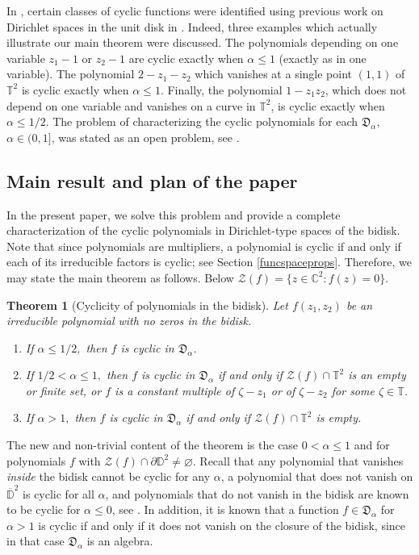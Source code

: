 \documentclass[11 pt,reqno]{amsart}
\newtheorem*{Mth}{Theorem}
\theoremstyle{definition}
\theoremstyle{remark}
\numberwithin{equation}{section} \numberwithin{figure}{section}
\begin{document}
In \cite{BCLSS13II}, certain classes of cyclic functions were
identified using previous work on Dirichlet spaces in the unit disk in
\cite{BCLSS13}.  Indeed, three examples which actually illustrate our
main theorem were discussed.  The polynomials depending on one
variable $z_1-1$ or $z_2-1$ are cyclic exactly when ${\alpha} \leq 1$
(exactly as in one variable).  The polynomial $2-z_1-z_2$ which
vanishes at a single point $(1,1)$ of ${{\mathbb T}}^2$ is cyclic exactly when
${\alpha} \leq 1$.  Finally, the polynomial $1-z_1z_2$, which does not
depend on one variable and vanishes on a curve in ${{\mathbb T}}^2$, is cyclic
exactly when ${\alpha} \leq 1/2$.  The problem of characterizing the cyclic
polynomials for each $\mathfrak{D}_{\alpha}$, $\alpha \in (0,1]$, was
stated as an open problem, see \cite[Problem 5.2]{BCLSS13II}.

\subsection{Main result and plan of the paper}
In the present paper, we solve this problem and provide a complete
characterization of the cyclic polynomials in Dirichlet-type spaces of the bidisk. 
Note that since polynomials are multipliers, a polynomial is cyclic if
and only if each of its irreducible factors is cyclic; see Section
\ref{funcspaceprops}.  Therefore, we may state the main theorem as
follows. Below ${\mathcal{Z}}(f) = \{z \in {{\mathbb C}}^2: f(z) = 0\}$.  

\begin{Mth}[Cyclicity of polynomials in the bidisk]
Let $f(z_1,z_2)$ be an irreducible polynomial with no zeros in the bidisk.
\begin{enumerate}
\item If $\alpha \leq 1/2,$ then $f$ is cyclic in $\mathfrak{D}_{\alpha}$.
\item If $ 1/2 < \alpha \leq 1,$ then $f$ is cyclic in $\mathfrak{D}_{\alpha}$ if and only if $\mathcal{Z}(f)\cap \mathbb{T}^2$ is an empty or finite set, or $f$ 
is a constant multiple of $\zeta - z_1$ or of $\zeta - z_2$ for some $\zeta \in {{\mathbb T}}$.
\item If $ \alpha > 1,$ then $f$ is cyclic in $\mathfrak{D}_{\alpha}$ if and only if $\mathcal{Z}(f)\cap \mathbb{T}^2$ is empty.
\end{enumerate}
\end{Mth}

The new and non-trivial content of the theorem is the case $0 <
\alpha \leq 1$ and for polynomials $f$ with
$\mathcal{Z}(f)\cap \partial {{\mathbb D}}^2\neq \varnothing$.  Recall that any
polynomial that vanishes {\it inside} the bidisk cannot be cyclic for
any $\alpha$, a polynomial that does not vanish on $\overline{{\mathbb D}}^2$
is cyclic for all $\alpha$, and polynomials that do not vanish in the
bidisk are known to be cyclic for $\alpha \leq 0$, see \cite{NGN}. In
addition, it is known that a function $f \in \mathfrak{D}_{\alpha}$
for $\alpha > 1$ is cyclic if and only if it does not vanish on the
closure of the bidisk, since in that case $\mathfrak{D}_{\alpha}$ is
an algebra.  
\end{document}
